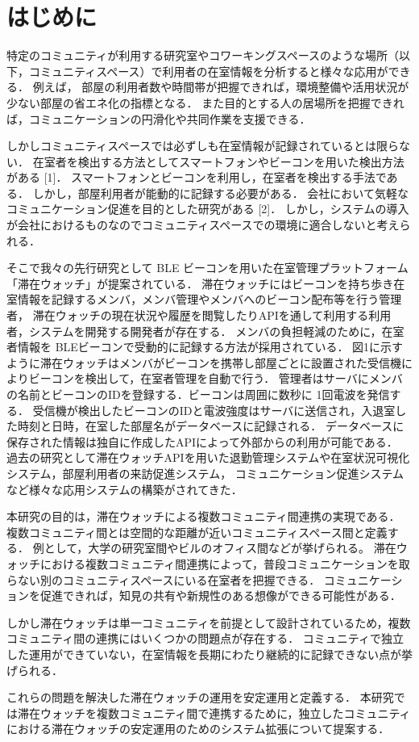 \thispagestyle{myheadings}

\section{はじめに}
\label{sec:intro}
特定のコミュニティが利用する研究室やコワーキングスペースのような場所（以下，コミュニティスペース）で利用者の在室情報を分析すると様々な応用ができる．
例えば， 部屋の利用者数や時間帯が把握できれば，環境整備や活用状況が少ない部屋の省エネ化の指標となる．
また目的とする人の居場所を把握できれば，コミュニケーションの円滑化や共同作業を支援できる．

しかしコミュニティスペースでは必ずしも在室情報が記録されているとは限らない．
在室者を検出する方法としてスマートフォンやビーコンを用いた検出方法がある [1]．
スマートフォンとビーコンを利用し，在室者を検出する手法である．
しかし，部屋利用者が能動的に記録する必要がある．
会社において気軽なコミュニケーション促進を目的とした研究がある [2]．
しかし，システムの導入が会社におけるものなのでコミュニティスペースでの環境に適合しないと考えられる．

そこで我々の先行研究として BLE ビーコンを用いた在室管理プラットフォーム「滞在ウォッチ」が提案されている．
滞在ウォッチにはビーコンを持ち歩き在室情報を記録するメンバ，メンバ管理やメンバへのビーコン配布等を行う管理者，
滞在ウォッチの現在状況や履歴を閲覧したりAPIを通して利用する利用者，システムを開発する開発者が存在する．
メンバの負担軽減のために，在室者情報を BLEビーコンで受動的に記録する方法が採用されている．
図1に示すように滞在ウォッチはメンバがビーコンを携帯し部屋ごとに設置された受信機によりビーコンを検出して，在室者管理を自動で行う．
管理者はサーバにメンバの名前とビーコンのIDを登録する．ビーコンは周囲に数秒に 1回電波を発信する．
受信機が検出したビーコンのIDと電波強度はサーバに送信され，入退室した時刻と日時，在室した部屋名がデータベースに記録される．
データベースに保存された情報は独自に作成したAPIによって外部からの利用が可能である．
過去の研究として滞在ウォッチAPIを用いた退勤管理システムや在室状況可視化システム，部屋利用者の来訪促進システム，
コミュニケーション促進システムなど様々な応用システムの構築がされてきた．

本研究の目的は，滞在ウォッチによる複数コミュニティ間連携の実現である．
複数コミュニティ間とは空間的な距離が近いコミュニティスペース間と定義する．
例として，大学の研究室間やビルのオフィス間などが挙げられる。
滞在ウォッチにおける複数コミュニティ間連携によって，普段コミュニケーションを取らない別のコミュニティスペースにいる在室者を把握できる．
コミュニケーションを促進できれば，知見の共有や新規性のある想像ができる可能性がある．

しかし滞在ウォッチは単一コミュニティを前提として設計されているため，複数コミュニティ間の連携にはいくつかの問題点が存在する．
コミュニティで独立した運用ができていない，在室情報を長期にわたり継続的に記録できない点が挙げられる．


これらの問題を解決した滞在ウォッチの運用を安定運用と定義する．
本研究では滞在ウォッチを複数コミュニティ間で連携するために，独立したコミュニティにおける滞在ウォッチの安定運用のためのシステム拡張について提案する．